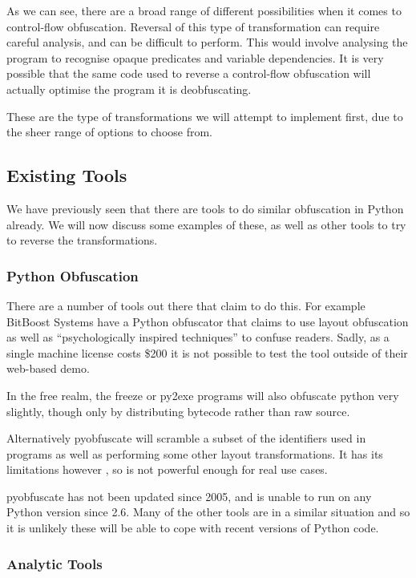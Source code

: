 \documentclass{report}
\begin{document}
As we can see, there are a broad range of different possibilities when it comes to control-flow obfuscation. Reversal of this type
of transformation can require careful analysis, and can be difficult to perform. This would involve analysing the program to recognise
opaque predicates and variable dependencies. It is very possible that the same code used to reverse a control-flow obfuscation will
actually optimise the program it is deobfuscating.

These are the type of transformations we will attempt to implement first, due to the sheer range of options to choose from.

\subsection{Existing Tools}

We have previously seen that there are tools to do similar obfuscation in Python already. We will now discuss some
examples of these, as well as other tools to try to reverse the transformations.

\subsubsection{Python Obfuscation}

There are a number of tools out there that claim to do this. For example BitBoost Systems have a Python obfuscator \cite{bitboost}
that claims to use layout obfuscation as well as ``psychologically inspired techniques'' to confuse readers. Sadly, as a
single machine license costs \$200 it is not possible to test the tool outside of their web-based demo.

In the free realm, the freeze \cite{freezereadme} or py2exe \cite{py2exe} programs will also obfuscate python very slightly,
though only by distributing bytecode rather than raw source.

Alternatively pyobfuscate \cite{pyobf} will scramble a subset of the identifiers used in programs as well as performing
some other layout transformations. It has its limitations however \cite{pyobf}, so is not powerful enough for real use cases.

pyobfuscate has not been updated since 2005, and is unable to run on any Python version since 2.6. Many of the other tools are in
a similar situation and so it is unlikely these will be able to cope with recent versions of Python code.

\subsubsection{Analytic Tools}
\end{document}
